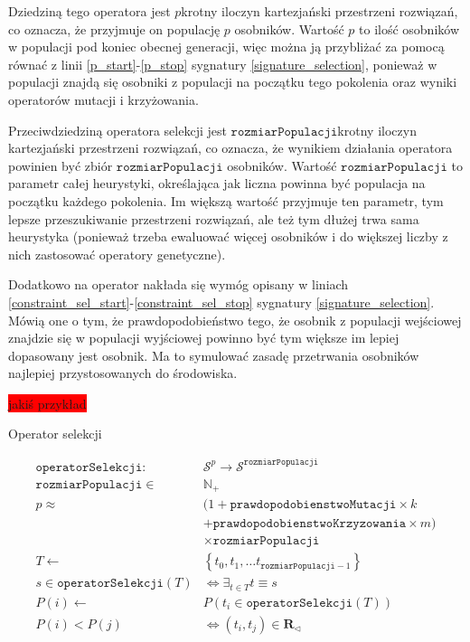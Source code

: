 \documentclass[twoside]{iisthesis}
\newcommand{\todo}{\colorbox{red}}
\newcommand{\numberSet}{\mathbb}
\newcommand{\important}{\mathcal}
\newcommand{\R}{\mathbf{R}}
\newcommand{\minoritySpecimenRel}{{\R}_{\lhd}}
\newcommand{\param}{\mathtt}
\begin{document}
Dziedziną tego operatora jest $p$krotny iloczyn kartezjański przestrzeni rozwiązań, co oznacza, że przyjmuje on populację $p$ osobników. Wartość $p$ to ilość osobników w populacji pod koniec obecnej generacji, więc można ją przybliżać za pomocą równać z linii \ref{p_start}-\ref{p_stop} sygnatury \ref{signature_selection}, ponieważ w populacji znajdą się osobniki z populacji na początku tego pokolenia oraz wyniki operatorów mutacji i krzyżowania. 

Przeciwdziedziną operatora selekcji jest $\param{rozmiarPopulacji}$krotny iloczyn kartezjański przestrzeni rozwiązań, co oznacza, że wynikiem działania operatora powinien być zbiór $\param{rozmiarPopulacji}$ osobników. Wartość $\param{rozmiarPopulacji}$ to parametr całej heurystyki, określająca jak liczna powinna być populacja na początku każdego pokolenia. Im większą wartość przyjmuje ten parametr, tym lepsze przeszukiwanie przestrzeni rozwiązań, ale też tym dłużej trwa sama heurystyka (ponieważ trzeba ewaluować więcej osobników i do większej liczby z nich zastosować operatory genetyczne). 

Dodatkowo na operator nakłada się wymóg opisany w liniach \ref{constraint_sel_start}-\ref{constraint_sel_stop} sygnatury \ref{signature_selection}. Mówią one o tym, że prawdopodobieństwo tego, że osobnik z populacji wejściowej znajdzie się w populacji wyjściowej powinno być tym większe im lepiej dopasowany jest osobnik. Ma to symulować zasadę przetrwania osobników najlepiej przystosowanych do środowiska.

\todo{jakiś przykład}

\begin{signature}
	\caption{Operator selekcji \label{signature_selection}}
	\begin{align}
	\param{operatorSelekcji}: &\important{S}^p \rightarrow \important{S}^{\param{rozmiarPopulacji}} \\
	\param{rozmiarPopulacji} \in &\numberSet{N}_{+} \\
	\label{p_start} 
	p \approx &(1 + \param{prawdopodobienstwoMutacji} \times k \\
	          &+ \param{prawdopodobienstwoKrzyzowania} \times m) \\
	\label{p_stop} 
	&\times \param{rozmiarPopulacji} \\
	\label{constraint_sel_start}          
	T \gets &\left\{ t_0, t_1, \ldots t_{\param{rozmiarPopulacji}-1} \right\} \\
	s \in \param{operatorSelekcji}(T) &\Leftrightarrow \exists_{t \in T}  t \equiv s \\
	P(i) \gets &P(t_i \in \param{operatorSelekcji}(T)) \\
	\label{constraint_sel_stop} 
	P(i) < P(j) &\Leftrightarrow (t_i, t_j) \in \minoritySpecimenRel
	\end{align}
\end{signature}
\end{document}

